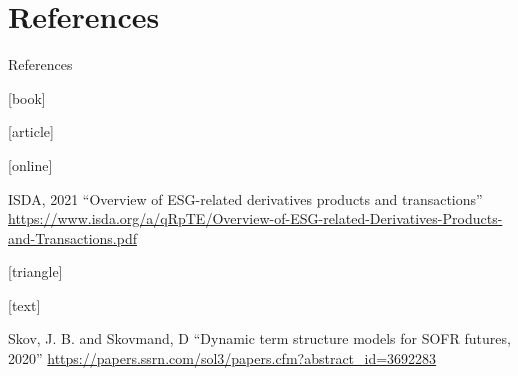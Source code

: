 \documentclass[UKenglish]{beamer}
\begin{document}
\section{References}


\begin{frame}[allowframebreaks]{References}
    \begin{thebibliography}{}

        [book]
        
        

        [article]

        

        [online]

        ISDA, 2021 
        \newblock \enquote{Overview of ESG-related derivatives products and transactions}
        \newblock \url{https://www.isda.org/a/qRpTE/Overview-of-ESG-related-Derivatives-Products-and-Transactions.pdf}
        

        


        [triangle]


        [text]

        

        Skov, J. B. and Skovmand, D
        \newblock \enquote{Dynamic term structure models for SOFR futures, 2020} 
        \newblock
        \url{https://papers.ssrn.com/sol3/papers.cfm?abstract_id=3692283}


\end{thebibliography}
\end{frame}
\end{document}
